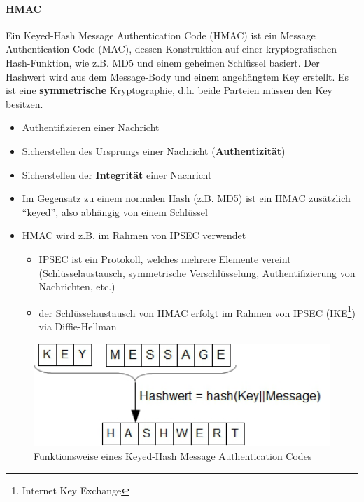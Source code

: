 \documentclass[10pt,a4paper]{article}
\begin{document}
\paragraph*{HMAC}Ein Keyed-Hash Message Authentication Code (HMAC) ist ein Message Authentication Code (MAC), dessen Konstruktion auf einer kryptografischen Hash-Funktion, wie z.B. MD5 und einem geheimen Schlüssel basiert. Der Hashwert wird aus dem Message-Body und einem angehängtem Key erstellt. Es ist eine \textbf{symmetrische} Kryptographie, d.h. beide Parteien müssen den Key besitzen.
\begin{itemize}[noitemsep,topsep=0pt,leftmargin=*]
    \item Authentifizieren einer Nachricht
    \item Sicherstellen des Ursprungs einer Nachricht (\textbf{Authentizität})
    \item Sicherstellen der \textbf{Integrität} einer Nachricht
    \item Im Gegensatz zu einem normalen Hash (z.B. MD5) ist ein HMAC zusätzlich "`keyed"', also abhängig von einem Schlüssel
    \item HMAC wird z.B. im Rahmen von IPSEC verwendet
    \begin{itemize}[noitemsep,topsep=0pt,leftmargin=*]
        \item IPSEC ist ein Protokoll, welches mehrere Elemente vereint\\
        (Schlüsselaustausch, symmetrische Verschlüsselung, Authentifizierung von Nachrichten, etc.)
        \item der Schlüsselaustausch von HMAC erfolgt im Rahmen von IPSEC (IKE\footnote{Internet Key Exchange}) via Diffie-Hellman
    \end{itemize}
\end{itemize}
\begin{figure}[H]
    \begin{center}
    \includegraphics[width=12cm]{images/hmac.png}
    \caption{Funktionsweise eines Keyed-Hash Message Authentication Codes}
    \label{hmac}
    \end{center}
\end{figure}
\end{document}
